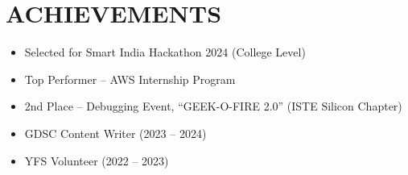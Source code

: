 \documentclass[a4paper,10pt]{article}
\newcommand{\resheading}[1]{\vspace{-5pt}\section*{\uppercase{#1}}\vspace{-6pt}}
\begin{document}
\resheading{Achievements}
\begin{itemize}[leftmargin=0.15in, itemsep=2pt, topsep=1pt]
  \item Selected for Smart India Hackathon 2024 (College Level)
  \item Top Performer – AWS Internship Program
  \item 2nd Place – Debugging Event, “GEEK-O-FIRE 2.0” (ISTE Silicon Chapter)
  \item GDSC Content Writer (2023 – 2024)
  \item YFS Volunteer (2022 – 2023)
\end{itemize}
\end{document}
